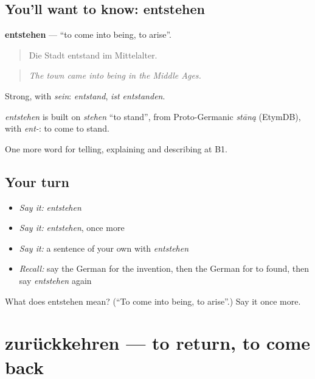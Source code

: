 \subsection*{You'll want to know: entstehen}
\textbf{entstehen} — \textquotedblleft{}to come into being, to arise\textquotedblright{}.

\begin{quote}
Die Stadt entstand im Mittelalter.
\end{quote}

\begin{quote}
\emph{The town came into being in the Middle Ages.}
\end{quote}

Strong, with \emph{sein}: \emph{entstand}, \emph{ist entstanden}.

\begin{cousinweb}
\emph{entstehen} is built on \emph{stehen} \textquotedblleft{}to stand\textquotedblright{}, from Proto-Germanic \emph{stāną} (EtymDB), with \emph{ent-}: to come to stand.
\end{cousinweb}

\begin{grammarlens}[title={What you've built}]
One more word for telling, explaining and describing at B1.
\end{grammarlens}

\subsection*{Your turn}
\begin{itemize}
\raggedright
  \item \emph{Say it:} \emph{entstehen}
  \item \emph{Say it:} \emph{entstehen}, once more
  \item \emph{Say it:} a sentence of your own with \emph{entstehen}
  \item \emph{Recall:} say the German for the invention, then the German for to found, then say \emph{entstehen} again
\end{itemize}

\begin{tcolorbox}[breakable,colback=teal!4,colframe=teal!35!black,title={Before you move on}]
What does entstehen mean? (\textquotedblleft{}To come into being, to arise\textquotedblright{}.) Say it once more.
\end{tcolorbox}
\section[zurückkehren]{zurückkehren — to return, to come back}


